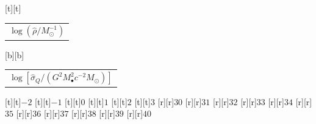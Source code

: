 %    
%
%
\begin{psfrags}%
\psfragscanon%
%
[t][t]{\color[rgb]{0,0,0}\setlength{\tabcolsep}{0pt}\begin{tabular}{c}{\Large$\log\left(\hat{\rho}/M_\odot^{-1}\right)$}\end{tabular}}%
[b][b]{\color[rgb]{0,0,0}\setlength{\tabcolsep}{0pt}\begin{tabular}{c}{\Large$\log\left[\hat{\sigma}_Q/\left(G^2 M_\bullet^2 c^{-2}M_\odot\right)\right]$}\end{tabular}}%
%
[t][t]{$-2$}%
[t][t]{$-1$}%
[t][t]{$0$}%
[t][t]{$1$}%
[t][t]{$2$}%
[t][t]{$3$}%
%
[r][r]{$30$}%
[r][r]{$31$}%
[r][r]{$32$}%
[r][r]{$33$}%
[r][r]{$34$}%
[r][r]{$35$}%
[r][r]{$36$}%
[r][r]{$37$}%
[r][r]{$38$}%
[r][r]{$39$}%
[r][r]{$40$}%
%
%
\end{psfrags}%
%
